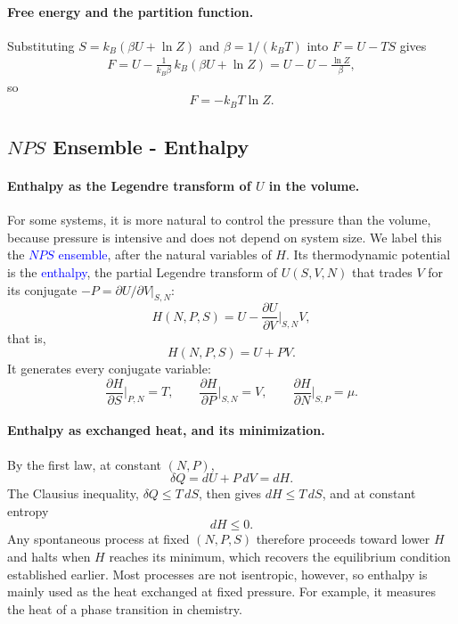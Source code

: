 \paragraph{Free energy and the partition function.}
Substituting $S=k_B(\beta U+\ln Z)$ and $\beta=1/(k_BT)$ into $F=U-TS$ gives
\begin{align*}
    F=U-\frac{1}{k_B\beta}\,k_B\left(\beta U+\ln Z\right)
    =U-U-\frac{\ln Z}{\beta},
\end{align*}
so
\begin{equation}
    \boxed{F=-k_BT\ln Z.}
\end{equation}

\subsection{$NPS$ Ensemble - Enthalpy}

\paragraph{Enthalpy as the Legendre transform of $U$ in the volume.}
For some systems, it is more natural to control the pressure than the
volume, because pressure is intensive and does not depend on system size. We label this the \textcolor{blue}{$NPS$ ensemble}, after the natural
variables of $H$. Its thermodynamic potential
is the \textcolor{blue}{enthalpy}, the partial Legendre transform of
$U(S,V,N)$ that trades $V$ for its conjugate $-P=\partial U/\partial V|_{S,N}$:
\begin{equation*}
    H(N,P,S)=U-\frac{\partial U}{\partial V}\bigg|_{S,N}V,
\end{equation*}
that is,
\begin{equation}
    \boxed{H(N,P,S)=U+PV.}
\end{equation}
It generates every conjugate variable:
\begin{equation}
    \boxed{\frac{\partial H}{\partial S}\bigg|_{P,N}=T,\qquad
    \frac{\partial H}{\partial P}\bigg|_{S,N}=V,\qquad
    \frac{\partial H}{\partial N}\bigg|_{S,P}=\mu.}
\end{equation}

\paragraph{Enthalpy as exchanged heat, and its minimization.}
By the first law, at constant $(N,P)$,
\begin{equation}
    \boxed{\delta Q=dU+P\,dV=dH.}
\end{equation}
The Clausius inequality, $\delta Q\leq T\,dS$, then gives $dH\leq T\,dS$, and
at constant entropy
\begin{equation}
    \boxed{dH\leq0.}
\end{equation}
Any spontaneous process at fixed $(N,P,S)$ therefore proceeds toward lower
$H$ and halts when $H$ reaches its minimum, which recovers the equilibrium
condition established earlier. Most processes are not isentropic, however,
so enthalpy is mainly used as the heat exchanged at fixed pressure. For
example, it measures the heat of a phase transition in chemistry.

